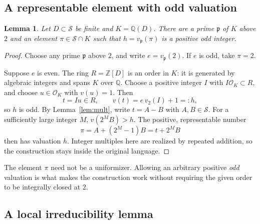 \documentclass[11pt,letterpaper]{article}
\numberwithin{equation}{section}
\newtheorem{lemma}[theorem]{Lemma}
\theoremstyle{definition}
\newcommand{\Sset}{\mathcal S}
\newcommand{\Z}{\mathbb Z}
\newcommand{\Q}{\mathbb Q}
\newcommand{\OK}{\mathcal O_K}
\begin{document}
\subsection{A representable element with odd valuation}

\begin{lemma}\label{lem:odd}
Let $D\subset\Sset$ be finite and $K=\Q(D)$. There are a prime
$\mathfrak p$ of $K$ above $2$ and an element $\pi\in\Sset\cap K$ such that
$h=v_{\mathfrak p}(\pi)$ is a positive odd integer.
\end{lemma}
\begin{proof}
Choose any prime $\mathfrak p$ above $2$, and write $e=v_{\mathfrak p}(2)$.
If $e$ is odd, take $\pi=2$.

Suppose $e$ is even. The ring $R=\Z[D]$ is an order in $K$: it is generated
by algebraic integers and spans $K$ over $\Q$. Choose a positive integer $I$
with $I\OK\subset R$, and choose $u\in\OK$ with $v(u)=1$.
Then
\[
 t=Iu\in R,\qquad v(t)=e\,v_2(I)+1=:h,
\]
so $h$ is odd. By Lemma~\ref{lem:mult}, write $t=A-B$ with
$A,B\in\Sset$. For a sufficiently large integer $M$,
$v(2^M B)>h$. The positive, representable number
\[
 \pi=A+(2^M-1)B=t+2^M B
\]
then has valuation $h$. Integer multiples here are realized by repeated
addition, so the construction stays inside the original language.
\end{proof}

The element $\pi$ need not be a uniformizer. Allowing an arbitrary positive
\emph{odd} valuation is what makes the construction work without requiring
the given order to be integrally closed at $2$.

\subsection{A local irreducibility lemma}
\end{document}
